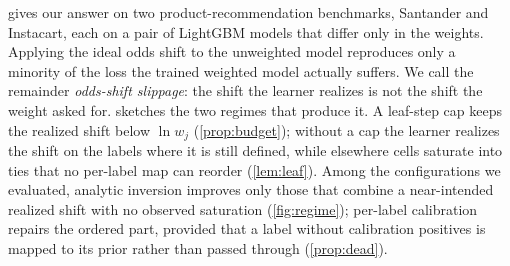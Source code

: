 \documentclass[sigconf,nonacm]{acmart}
\begin{document}
 gives our answer on two product-recommendation benchmarks, Santander and Instacart, each on a pair of LightGBM models that differ only in the weights. Applying the ideal odds shift to the unweighted model reproduces only a minority of the loss the trained weighted model actually suffers. We call the remainder \emph{odds-shift slippage}: the shift the learner realizes is not the shift the weight asked for.  sketches the two regimes that produce it. A leaf-step cap keeps the realized shift below $\ln w_j$ (\cref{prop:budget}); without a cap the learner realizes the shift on the labels where it is still defined, while elsewhere cells saturate into ties that no per-label map can reorder (\cref{lem:leaf}). Among the configurations we evaluated, analytic inversion improves only those that combine a near-intended realized shift with no observed saturation (\cref{fig:regime}); per-label calibration repairs the ordered part, provided that a label without calibration positives is mapped to its prior rather than passed through (\cref{prop:dead}).
\end{document}
